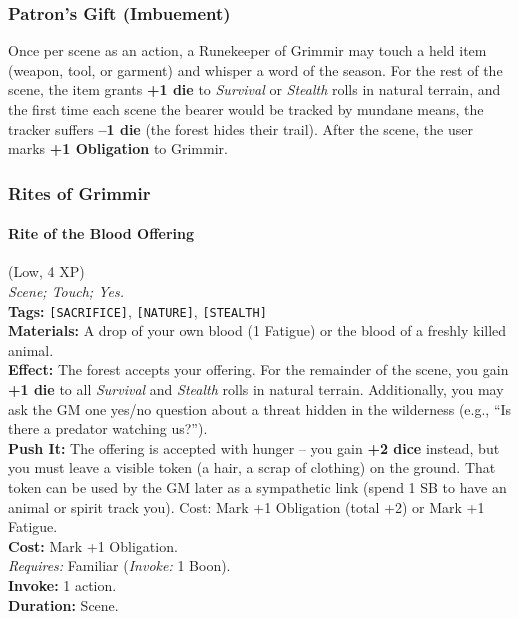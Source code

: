 \subsubsection*{Patron's Gift (Imbuement)}

Once per scene as an action, a Runekeeper of Grimmir may touch a held item (weapon, tool, or garment) and whisper a word of the season. For the rest of the scene, the item grants \textbf{+1 die} to \textit{Survival} or \textit{Stealth} rolls in natural terrain, and the first time each scene the bearer would be tracked by mundane means, the tracker suffers \textbf{--1 die} (the forest hides their trail). After the scene, the user marks \textbf{+1 Obligation} to Grimmir.

\subsubsection*{Rites of Grimmir}

\paragraph{Rite of the Blood Offering} (Low, 4 XP) \hfill \\
\emph{Scene; Touch; Yes.} \\
\textbf{Tags:} \texttt{[SACRIFICE]}, \texttt{[NATURE]}, \texttt{[STEALTH]} \\
\textbf{Materials:} A drop of your own blood (1 Fatigue) or the blood of a freshly killed animal. \\
\textbf{Effect:} The forest accepts your offering. For the remainder of the scene, you gain \textbf{+1 die} to all \textit{Survival} and \textit{Stealth} rolls in natural terrain. Additionally, you may ask the GM one yes/no question about a threat hidden in the wilderness (e.g., ``Is there a predator watching us?''). \\
\textbf{Push It:} The offering is accepted with hunger -- you gain \textbf{+2 dice} instead, but you must leave a visible token (a hair, a scrap of clothing) on the ground. That token can be used by the GM later as a sympathetic link (spend 1 SB to have an animal or spirit track you). Cost: Mark +1 Obligation (total +2) or Mark +1 Fatigue. \\
\textbf{Cost:} Mark +1 Obligation. \\
\textit{Requires:} Familiar (\textit{Invoke:} 1 Boon). \\
\textbf{Invoke:} 1 action. \\
\textbf{Duration:} Scene.

